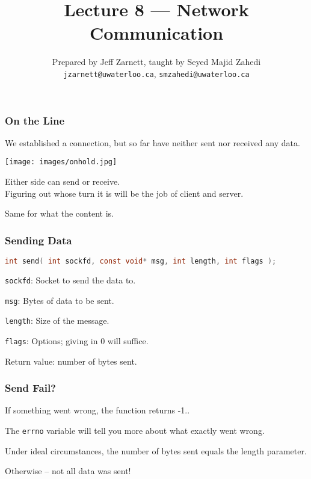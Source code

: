 

\title{Lecture 8 --- Network Communication }

\author{Prepared by Jeff Zarnett, taught by Seyed Majid Zahedi \\ \small \texttt{jzarnett@uwaterloo.ca}, \texttt{smzahedi@uwaterloo.ca}}
\date{}




\begin{frame}
	\titlepage

\end{frame}



\begin{frame}
	\frametitle{On the Line}

	We established a connection, but so far have neither sent nor received any data.

	\begin{center}
		\texttt{[image: images/onhold.jpg]}
	\end{center}

	Either side can send or receive.\\
	\quad Figuring out whose turn it is will be the job of client and server.

	Same for what the content is.

\end{frame}



\begin{frame}[fragile]
	\frametitle{Sending Data}

	\begin{lstlisting}[language=C]
int send( int sockfd, const void* msg, int length, int flags );
\end{lstlisting}

	\texttt{sockfd}: Socket to send the data to.

	\texttt{msg}: Bytes of data to be sent.

	\texttt{length}: Size of the message.

	\texttt{flags}: Options; giving in 0 will suffice.

	Return value: number of bytes sent.

\end{frame}



\begin{frame}
	\frametitle{Send Fail?}

	If something went wrong, the function returns -1..

	The \texttt{errno} variable will tell you more about what exactly went wrong.

	Under ideal circumstances, the number of bytes sent equals the length parameter.

	Otherwise -- not all data was sent!

\end{frame}



